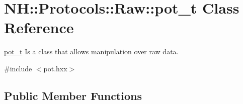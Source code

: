 \hypertarget{class_n_h_1_1_protocols_1_1_raw_1_1pot__t}{\section{N\+H\+:\+:Protocols\+:\+:Raw\+:\+:pot\+\_\+t Class Reference}
\label{class_n_h_1_1_protocols_1_1_raw_1_1pot__t}
}


\hyperlink{class_n_h_1_1_protocols_1_1_raw_1_1pot__t}{pot\+\_\+t} Is a class that allows manipulation over raw data.  




{\ttfamily \#include $<$pot.\+hxx$>$}

\subsection*{Public Member Functions}

